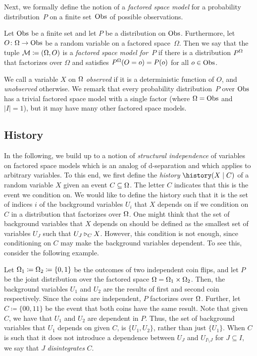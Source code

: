 \documentclass[USenglish,onecolumn]{article}
\begin{document}
Next, we formally define the notion of a \emph{factored space model} for a probability distribution~$P$ on a finite set~${\textnormal{Obs}}$ of possible observations.
\begin{definition}  \label{def:FSM}
    Let ${\textnormal{Obs}}$ be a finite set and let $P$ be a distribution on ${\textnormal{Obs}}$.
    Furthermore, let $O\colon\Omega\to{\textnormal{Obs}}$ be a random variable on a factored space~$\Omega$.
    Then we say that the tuple $\mathcal{M}\coloneqq(\Omega,O)$ is a \emph{factored space model for~$P$} if there is a distribution $P^\Omega$ that factorizes over $\Omega$ and satisfies $P^\Omega(O=o)=P(o)$ for all $o\in{\textnormal{Obs}}$.
\end{definition}
We call a variable $X$ on $\Omega$ \emph{observed} if it is a deterministic function of $O$, and \emph{unobserved} otherwise.
%
We remark that every probability distribution~$P$ over ${\textnormal{Obs}}$ has a trivial factored space model with a single factor (where $\Omega={\textnormal{Obs}}$ and $|I|=1$), but it may have many other factored space models.

\subsection {History}

In the following, we build up to a notion of \textit{structural independence} of variables on factored space models which is an analog of d-separation and which applies to arbitrary variables. To this end, we first define the \textit{history} $\history(X\mid C)$ of a random variable $X$ given an event $C\subseteq \Omega$. The letter $C$ indicates that this is the event we condition on.
We would like to define the history such that it is the set of indices $i$ of the background variables $U_i$ that $X$ depends on if we condition on $C$ in a distribution that factorizes over $\Omega$.
One might think that the set of background variables that $X$ depends on should be defined as the smallest set of variables $U_J$ such that $U_J\triangleright_C X$. However, this condition is not enough, since conditioning on $C$ may make the background variables dependent. To see this, consider the following example.

Let $\Omega_1\coloneq\Omega_2\coloneq\{0,1\}$ be the outcomes of two independent coin flips, and let $P$ be the joint distribution over the factored space $\Omega=\Omega_1\times \Omega_2$. Then, the background variables $U_1$ and $U_2$ are the results of first and second coin respectively. Since the coins are independent, $P$ factorizes over $\Omega$. Further, let $C\coloneq \{00, 11\}$ be the event that both coins have the same result. Note that given $C$, we have that $U_1$ and $U_2$ are dependent in $P$. Thus, the set of background variables that $U_1$ depends on given $C$, is $\{U_1, U_2\}$, rather than just $\{U_1\}$. When $C$ is such that it does not introduce a dependence between $U_J$ and $U_{I\setminus J}$ for $J\subseteq I$, we say that $J$ \emph{disintegrates} $C$.
\end{document}

